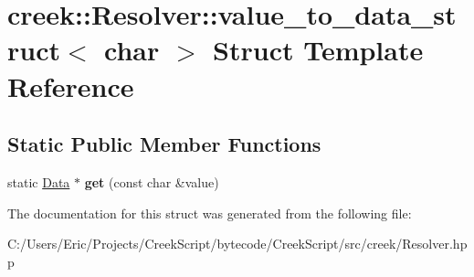 \hypertarget{structcreek_1_1_resolver_1_1value__to__data__struct_3_01char_01_4}{}\section{creek\+:\+:Resolver\+:\+:value\+\_\+to\+\_\+data\+\_\+struct$<$ char $>$ Struct Template Reference}
\label{structcreek_1_1_resolver_1_1value__to__data__struct_3_01char_01_4}
\subsection*{Static Public Member Functions}
\begin{DoxyCompactItemize}
\item 
static \hyperlink{classcreek_1_1_data}{Data} $\ast$ {\bfseries get} (const char \&value)\hypertarget{structcreek_1_1_resolver_1_1value__to__data__struct_3_01char_01_4_a4a018c23887eb88103285e52efc60166}{}\label{structcreek_1_1_resolver_1_1value__to__data__struct_3_01char_01_4_a4a018c23887eb88103285e52efc60166}

\end{DoxyCompactItemize}


The documentation for this struct was generated from the following file\+:\begin{DoxyCompactItemize}
\item 
C\+:/\+Users/\+Eric/\+Projects/\+Creek\+Script/bytecode/\+Creek\+Script/src/creek/Resolver.\+hpp\end{DoxyCompactItemize}
